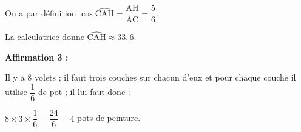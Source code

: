 %
%
% 
%
%
On a par définition $\cos \widehat{\text{CAH}} = \dfrac{\text{AH}}{\text{AC}} = \dfrac{5}{6}$.

La calculatrice donne $\widehat{\text{CAH}} \approx 33,6$\degres.

\medskip

\textbf{Affirmation 3 : }

%
Il y a 8 volets ; il faut trois couches sur chacun d'eux et pour chaque couche il utilise $\dfrac{1}{6}$ de pot ; il lui faut donc :

$8 \times 3 \times \dfrac{1}{6} = \dfrac{24}{6} = 4$ pots de peinture.

\bigskip

